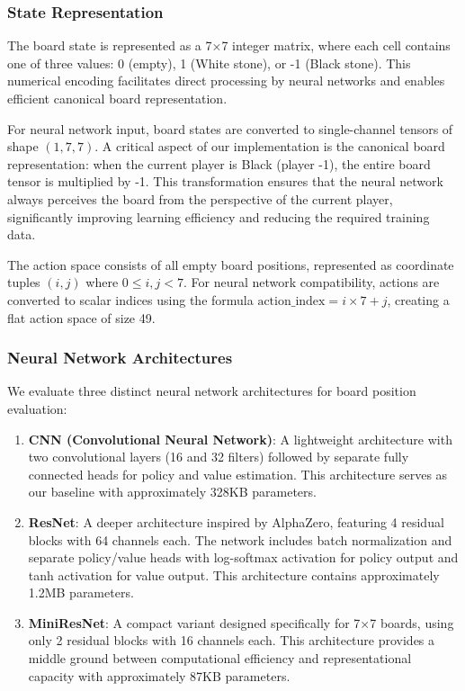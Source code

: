 \documentclass[conference]{IEEEtran}
\begin{document}
\subsubsection{State Representation}

The board state is represented as a 7×7 integer matrix, where each cell contains one of three values: 0 (empty), 1 (White stone), or -1 (Black stone). This numerical encoding facilitates direct processing by neural networks and enables efficient canonical board representation.

For neural network input, board states are converted to single-channel tensors of shape $(1, 7, 7)$. A critical aspect of our implementation is the canonical board representation: when the current player is Black (player -1), the entire board tensor is multiplied by -1. This transformation ensures that the neural network always perceives the board from the perspective of the current player, significantly improving learning efficiency and reducing the required training data.

The action space consists of all empty board positions, represented as coordinate tuples $(i, j)$ where $0 \leq i, j < 7$. For neural network compatibility, actions are converted to scalar indices using the formula $\text{action\_index} = i \times 7 + j$, creating a flat action space of size 49.

\subsubsection{Neural Network Architectures}

We evaluate three distinct neural network architectures for board position evaluation:

\begin{enumerate}
\item \textbf{CNN (Convolutional Neural Network)}: A lightweight architecture with two convolutional layers (16 and 32 filters) followed by separate fully connected heads for policy and value estimation. This architecture serves as our baseline with approximately 328KB parameters.

\item \textbf{ResNet}: A deeper architecture inspired by AlphaZero, featuring 4 residual blocks with 64 channels each. The network includes batch normalization and separate policy/value heads with log-softmax activation for policy output and tanh activation for value output. This architecture contains approximately 1.2MB parameters.

\item \textbf{MiniResNet}: A compact variant designed specifically for 7×7 boards, using only 2 residual blocks with 16 channels each. This architecture provides a middle ground between computational efficiency and representational capacity with approximately 87KB parameters.
\end{enumerate}
\end{document}
